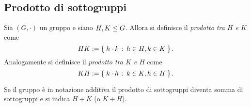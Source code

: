 \subsection{Prodotto di sottogruppi}

\begin{definition}
    Sia $(G, \cdot)$ un gruppo e siano $H,K \leq G$. Allora si definisce il \emph{prodotto tra $H$ e $K$} come \begin{equation}
        HK := \left\{\;h\cdot k \,:\, h \in H, k \in K\;\right\}.
    \end{equation} Analogamente si definisce il \emph{prodotto tra $K$ e $H$} come \begin{equation}
        KH := \left\{\;k \cdot h \,:\, k \in K, h \in H\;\right\}.
    \end{equation}
\end{definition}

\begin{remark}
    Se il gruppo è in notazione additiva il prodotto di sottogruppi diventa somma di sottogruppi e si indica $H + K$ (o $K + H$).
\end{remark}

